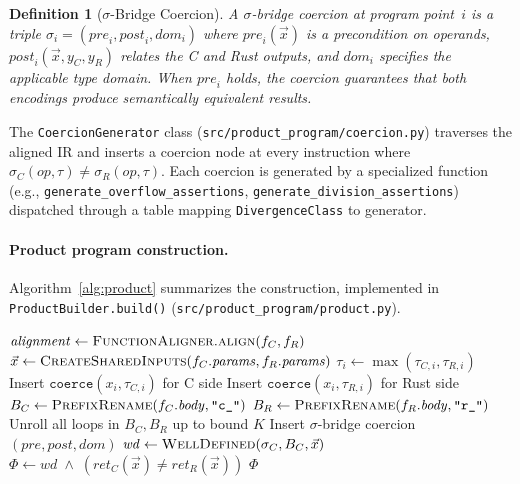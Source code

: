 \documentclass[10pt,a4paper]{article}
\newtheorem{definition}[theorem]{Definition}
\begin{document}
\begin{definition}[$\sigma$-Bridge Coercion]\label{def:sigma-coercion}
A $\sigma$-bridge coercion at program point~$i$ is a triple
$\sigma_i = (\mathit{pre}_i, \mathit{post}_i, \mathit{dom}_i)$
where $\mathit{pre}_i(\vec{x})$ is a precondition on operands,
$\mathit{post}_i(\vec{x}, y_C, y_R)$ relates the C and Rust outputs,
and $\mathit{dom}_i$ specifies the applicable type domain.
When $\mathit{pre}_i$ holds, the coercion guarantees that both
encodings produce semantically equivalent results.
\end{definition}

The \texttt{CoercionGenerator} class
(\texttt{src/product\_program/coercion.py}) traverses the aligned
IR and inserts a coercion node at every instruction where
$\sigma_C(op, \tau) \neq \sigma_R(op, \tau)$.  Each coercion is
generated by a specialized function (e.g.,
\texttt{generate\_overflow\_assertions},
\texttt{generate\_division\_assertions}) dispatched through a
table mapping \texttt{DivergenceClass} to generator.

\paragraph{Product program construction.}
Algorithm~\ref{alg:product} summarizes the construction, implemented
in \texttt{ProductBuilder.build()} (\texttt{src/product\_program/product.py}).

\begin{algorithm}[t]
\caption{$\sigma$-Bridge Product Program Construction}\label{alg:product}
\begin{algorithmic}[1]
  \State $\mathit{alignment} \gets
    \Call{FunctionAligner.align}{f_C, f_R}$
  \State $\vec{x} \gets \Call{CreateSharedInputs}{
    f_C.\mathit{params}, f_R.\mathit{params}}$
    \State $\tau_i \gets \max(\tau_{C,i}, \tau_{R,i})$
    \State Insert $\texttt{coerce}(x_i, \tau_{C,i})$ for C side
    \State Insert $\texttt{coerce}(x_i, \tau_{R,i})$ for Rust side
  \EndFor
  \State $B_C \gets \Call{PrefixRename}{f_C.\mathit{body},
    \texttt{"c\_"}}$
  \State $B_R \gets \Call{PrefixRename}{f_R.\mathit{body},
    \texttt{"r\_"}}$
  \State Unroll all loops in $B_C, B_R$ up to bound $K$
      \State Insert $\sigma$-bridge coercion
        $(\mathit{pre}, \mathit{post}, \mathit{dom})$
    \EndIf
  \EndFor
  \State $\mathit{wd} \gets \Call{WellDefined}{\sigma_C, B_C,
    \vec{x}}$
  \State $\Phi \gets \mathit{wd} \;\wedge\;
    (\mathit{ret}_C(\vec{x}) \neq \mathit{ret}_R(\vec{x}))$
  \State \Return $\Phi$
\EndProcedure
\end{algorithmic}
\end{algorithm}
\end{document}

